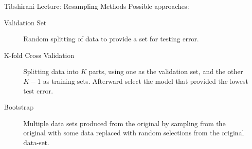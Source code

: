 \documentclass{beamer}
\begin{document}
\begin{frame}{Tibshirani Lecture: Resampling Methods}
	Possible approaches: \vspace{1em}
	\begin{description}
		\item[Validation Set] Random splitting of data to provide a set for testing error.
		\item[K-fold Cross Validation] Splitting data into $K$ parts, using one as the validation set, and the other $K-1$ as training sets. Afterward select the model that provided the lowest test error.
		\item[Bootstrap] Multiple data sets produced from the original by sampling from the original with some data replaced with random selections from the original data-set.
	\end{description}
\end{frame}
\end{document}
